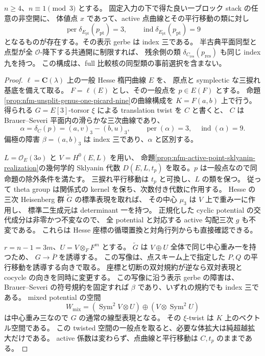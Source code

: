 \begin{proposition}[指数九の点障害を持つ非分裂一ブロック族]
\label{prop:nfm-unsplit-point-index-nine-family}
$n\ge4$、$n\equiv1\pmod3$ とする。
固定入力の下で得た良い一ブロック stack の任意の非空開に、
体値点 $x$ であって、active 点曲線とその平行移動の類に対し
\[
 \operatorname{per}\delta_{E_{\mathrm{pt}}}(p_{\mathrm{pt}})=3,
 \qquad\operatorname{ind}\delta_{E_{\mathrm{pt}}}(p_{\mathrm{pt}})=9
\]
となるものが存在する。その表示 gerbe は index 三である。
半古典平面同型と点型が全 $\mathcal O$-降下する共通開に制限すれば、
残余側の類 $\delta_{C_{\mathrm{res}}}(p_{\mathrm{res}})$ も同じ index 九を持つ。
この構成は、full 比較核の同型類の事前選択を含まない。
\end{proposition}

\begin{proof}
$\ell=\mathbf C(\lambda)$ 上の一般 Hesse 楕円曲線 $E$ を、
原点と symplectic な三捩れ基底を備えて取る。
$F=\ell(E)$ とし、その一般点を $p\in E(F)$ とする。
命題\ref{prop:nfm-unsplit-genus-one-picard-nine}の曲線構成を $K=F(a,b)$ 上で行う。
得られる $G=E[3]$-torsor $\xi$ による translation twist を $C$ と書くと、
$C$ は Brauer--Severi 平面内の滑らかな三次曲線であり、
\[
 \alpha=\delta_C(p)=(a,v)_3-(b,u)_3,
 \qquad\operatorname{per}(\alpha)=3,\quad\operatorname{ind}(\alpha)=9.
\]
偏極の障害 $\beta=(a,b)_3$ は index 三であり、$\alpha$ と区別する。

$L=\mathcal O_E(3o)$ と $V=H^0(E,L)$ を用い、
命題\ref{prop:nfm-active-point-sklyanin-realization}の幾何学的 Sklyanin 代数
$D(E,L,t_p)$ を取る。$p$ は一般点なので同命題の除外条件を満たす。
三捩れ平行移動は $t_p$ と可換し、$L$ の類を保つ。
従って theta group は関係式の kernel を保ち、次数付き代数に作用する。
Hesse の三次 Heisenberg 群 $\widetilde G$ の標準表現を取れば、
その中心 $\mu_3$ は $V$ 上で重み一に作用し、
標準二生成元は determinant 一を持つ。
正規化した cyclic potential の交代成分は非零かつ不変なので、
全 potential と対応する active 勾配三次 $g$ も不変である。
これらは Hesse 座標の循環置換と対角行列からも直接確認できる。

$r=n-1=3m$、$U=V\otimes_F F^m$ とする。
$\widetilde G$ は $V\oplus U$ 全体で同じ中心重み一を持つため、
$G\to\overline P$ を誘導する。
この写像は、点スキーム上で指定した $P,Q$ の平行移動を誘導する向きで取る。
座標と切断の双対規約が逆なら双対表現と cocycle の向きを同時に変更する。
この写像に沿う表示 gerbe の障害は、Brauer--Severi の符号規約を固定すれば
$\beta$ であり、いずれの規約でも index 三である。
mixed potential の空間
\[
 W_{\mathrm{mix}}=(\operatorname{Sym}^2V\otimes U)
       \oplus(V\otimes\operatorname{Sym}^2U)
\]
は中心重み三なので $G$ の通常の線型表現となる。
その $\xi$-twist は $K$ 上のベクトル空間である。
この twisted 空間の一般点を取ると、必要な体拡大は純超越拡大だけである。
active 係数は変わらず、点曲線と平行移動は $C,t_p$ のままである。


\end{proof}
